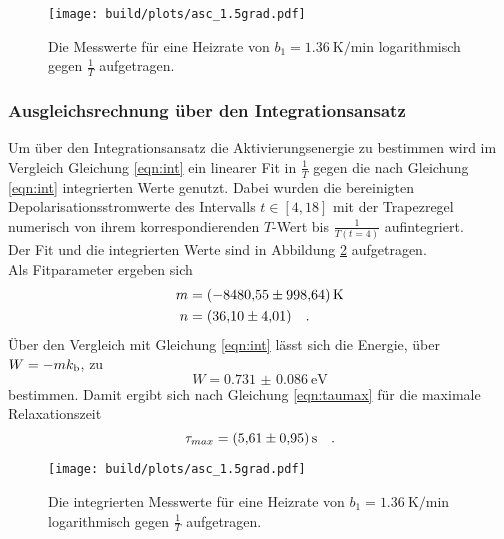 \begin{figure}[ht]
  \centering
  \texttt{[image: build/plots/asc\_1.5grad.pdf]}
  \caption{Die Messwerte für eine Heizrate von $b_1 = \SI{1.36}{\kelvin\per\minute}$ 
          logarithmisch gegen $\frac{1}{T}$ aufgetragen.}
  \label{img:pol15}
\end{figure}



\subsubsection{Ausgleichsrechnung über den Integrationsansatz}
\label{sec:int}

\noindent 
Um über den Integrationsansatz die Aktivierungsenergie zu bestimmen wird im Vergleich Gleichung \ref{eqn:int} ein linearer Fit in 
$\frac{1}{T}$ gegen die nach Gleichung \ref{eqn:int} integrierten Werte genutzt. Dabei wurden die bereinigten Depolarisationsstromwerte
des Intervalls $t \in [4,18]$  mit der Trapezregel numerisch von ihrem korrespondierenden $T$-Wert bis $\frac{1}{T(t = 4)}$ aufintegriert.\\
Der Fit und die integrierten Werte sind in Abbildung \ref{img:int15} aufgetragen.\\
Als Fitparameter ergeben sich 
\begin{align*}
  m & = \SI{ -8480.55(99864)}{\kelvin}\\
  n & = \SI{36.10 (401)}{} \quad .
\end{align*}
Über den Vergleich mit Gleichung \ref{eqn:int} lässt sich die Energie, über $W = -m k_{\text{b}}$, zu 
\begin{equation*}
  W = \SI{0.731(0086)}{\electronvolt}
\end{equation*}
bestimmen. Damit ergibt sich nach Gleichung \ref{eqn:taumax} für die maximale Relaxationszeit 
\begin{equation*}
  \tau_{max} = \SI{5.61 (095)}{\second} \quad .
\end{equation*}

\begin{figure}[ht]
  \centering
  \texttt{[image: build/plots/asc\_1.5grad.pdf]}
  \caption{Die integrierten Messwerte für eine Heizrate von $b_1 = \SI{1.36}{\kelvin\per\minute}$ 
          logarithmisch gegen $\frac{1}{T}$ aufgetragen.}
  \label{img:int15}
\end{figure}

